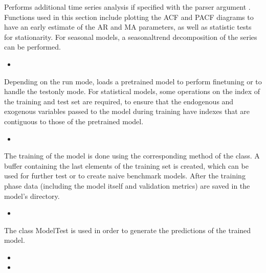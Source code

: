 \documentclass[letterpaper,10pt,english]{sphinxmanual}
\begin{document}
\sphinxAtStartPar
Performs additional time series analysis if specified with the parser argument .
Functions used in this section include plotting the ACF and PACF diagrams to have an early estimate of the AR and MA parameters,
as well as statistic tests for stationarity. For seasonal models, a seasonal\sphinxhyphen{}trend decomposition of the series can be performed.
\begin{itemize}
\item {} 
\sphinxAtStartPar
{}

\end{itemize}

\sphinxAtStartPar
Depending on the run mode, loads a pre\sphinxhyphen{}trained model to perform fine\sphinxhyphen{}tuning or to handle the test\sphinxhyphen{}only mode.
For statistical models, some operations on the index of the training and test set are required, to ensure that the endogenous
and exogenous variables passed to the model during training have indexes that are contiguous to those of the pre\sphinxhyphen{}trained model.
\begin{itemize}
\item {} 
\sphinxAtStartPar
{}

\end{itemize}

\sphinxAtStartPar
The training of the model is done using the corresponding method of the  class.
A buffer containing the last  elements of the training set is created, which can be used for
further test or to create naive benchmark models. After the training phase data (including the model itself and validation metrics)
are saved in the model’s directory.
\begin{itemize}
\item {} 
\sphinxAtStartPar
{}

\end{itemize}

\sphinxAtStartPar
The class ModelTest is used in order to generate the predictions of the trained model.
\begin{itemize}
\item {} 
\sphinxAtStartPar
{}

\item {} 
\sphinxAtStartPar
{}

\end{itemize}
\end{document}
